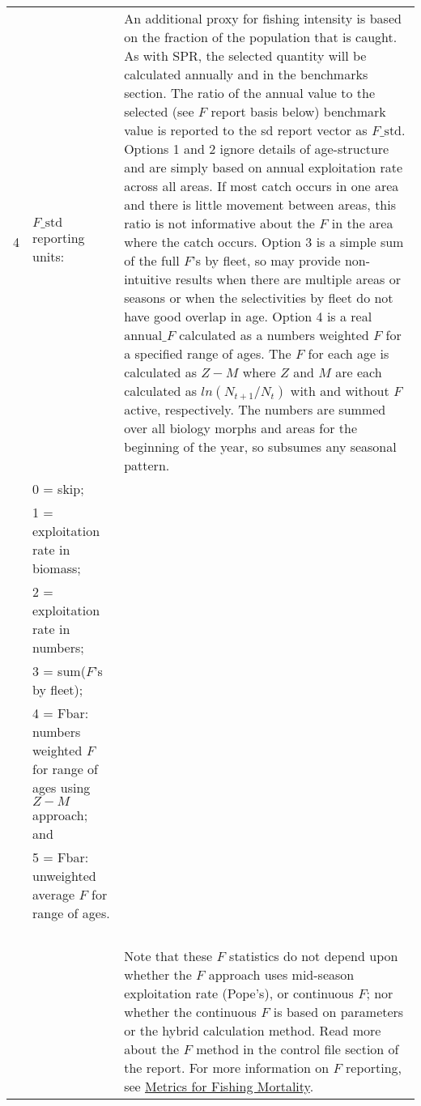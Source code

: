 {\begin{landscape}
\begin{longtable}{p{1.5cm} p{7.2cm} p{12.3cm}}
\hline 
 4 & $F\text{\_std}$ reporting units: & \multirow{1}{1cm}[-0.25cm]{\parbox{12.5cm}{An additional proxy for fishing intensity is based on the fraction of the population that is caught. As with SPR, the selected quantity will be calculated annually and in the benchmarks section. The ratio of the annual value to the selected (see $F$ report basis below) benchmark value is reported to the \gls{sd} report vector as $F\text{\_std}$. Options 1 and 2 ignore details of age-structure and are simply based on annual exploitation rate across all areas. If most catch occurs in one area and there is little movement between areas, this ratio is not informative about the $F$ in the area where the catch occurs. Option 3 is a simple sum of the full $F$'s by fleet, so may provide non-intuitive results when there are multiple areas or seasons or when the selectivities by fleet do not have good overlap in age. Option 4 is a real $\text{annual\_}F$ calculated as a numbers weighted $F$ for a specified range of ages. The $F$ for each age is calculated as $Z-M$ where $Z$ and $M$ are each calculated as $ln(N_{t+1}/N_{t})$ with and without $F$ active, respectively. The numbers are summed over all biology morphs and areas for the beginning of the year, so subsumes any seasonal pattern.}} \Tstrut\Bstrut\\
   & 0 = skip; & \\
   & 1 = exploitation rate in biomass; & \\
   & 2 = exploitation rate in numbers; & \\
   & 3 = sum($F$'s by fleet); & \\
   & 4 = Fbar: numbers weighted $F$ for range of ages using $Z-M$ approach; and & \\
   & 5 = Fbar: unweighted average $F$ for range of ages. & \\
   & & \\
   & & \Bstrut\\
   & & \Bstrut\\
   & & \Bstrut\\
   & & Note that these $F$ statistics do not depend upon whether the $F$ approach uses mid-season exploitation rate (Pope's), or continuous $F$; nor whether the continuous $F$ is based on parameters or the hybrid calculation method. Read more about the $F$ method in the control file section of the report. For more information on $F$ reporting, see \hyperlink{FMortality}{Metrics for Fishing Mortality}. \Bstrut\\ 
  

\end{longtable}
\end{landscape}}
